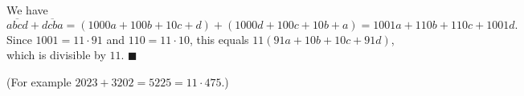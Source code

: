 We have
\[\overline{abcd}+\overline{dcba}=(1000a+100b+10c+d)+(1000d+100c+10b+a)=1001a+110b+110c+1001d.\]
Since $1001=11\cdot91$ and $110=11\cdot10$, this equals $11(91a+10b+10c+91d)$, which is divisible by $11$. $\blacksquare$

(For example $2023+3202=5225=11\cdot475$.)
